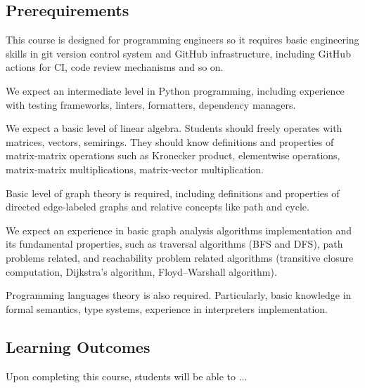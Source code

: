 \documentclass[sigconf]{acmart}
\begin{document}
\subsection{Prerequirements}

This course is designed for programming engineers so it requires basic engineering skills in git version control system and GitHub infrastructure, including GitHub actions for CI, code review mechanisms and so on.

We expect an intermediate level in Python programming, including experience with testing frameworks, linters, formatters, dependency managers. 

We expect a basic level of linear algebra.
Students should freely operates with matrices, vectors, semirings.
They should know definitions and properties of matrix-matrix operations such as Kronecker product, elementwise operations, matrix-matrix multiplications, matrix-vector multiplication. 

Basic level of graph theory is required, including definitions and properties of directed edge-labeled graphs and relative concepts like path and cycle.

We expect an experience in basic graph analysis algorithms implementation and its fundamental properties, such as traversal algorithms (BFS and DFS), path problems related, and reachability problem related algorithms (transitive closure computation, Dijkstra's algorithm, Floyd–Warshall algorithm).

Programming languages theory is also required. 
Particularly, basic knowledge in formal semantics, type systems, experience in interpreters implementation.

\subsection{Learning Outcomes}

Upon completing this course, students will be able to ...
\end{document}
